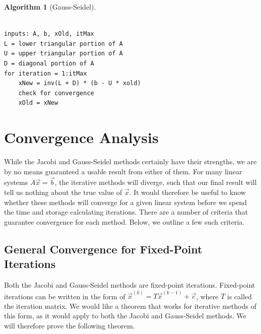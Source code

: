 \documentclass[12pt,letterpaper]{article}
\theoremstyle{definition}
\newtheorem{algorithm}[thm]{Algorithm}
\begin{document}
\begin{algorithm}[Gauss-Seidel]
\footnotesize
\begin{verbatim}

inputs: A, b, xOld, itMax
L = lower triangular portion of A
U = upper triangular portion of A
D = diagonal portion of A
for iteration = 1:itMax
    xNew = inv(L + D) * (b - U * xold)
    check for convergence
    xOld = xNew
\end{verbatim}
%
\end{algorithm}

\section{Convergence Analysis}

While the Jacobi and Gauss-Seidel methods certainly have their strengths, we are by no means guaranteed a usable result from either of them. For many linear systems $A\vec{x} = \vec{b}$, the iterative methods will diverge, such that our final result will tell us nothing about the true value of $\vec{x}$. It would therefore be useful to know whether these methods will converge for a given linear system before we spend the time and storage calculating iterations. There are a number of criteria that guarantee convergence for each method. Below, we outline a few such criteria.

\subsection{General Convergence for Fixed-Point Iterations}
Both the Jacobi and Gauss-Seidel methods are fixed-point iterations. Fixed-point iterations can be written in the form of $\vec{x}^{(k)} = T\vec{x}^{(k-1)} + \vec{c}$, where $T$ is called the iteration matrix. We would like a theorem that works for iterative methods of this form, as it would apply to both the Jacobi and Gauss-Seidel methods. We will therefore prove the following theorem.
\end{document}
